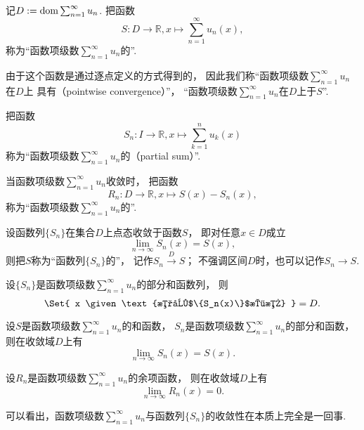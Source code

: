 \begin{definition}
记\(D := \operatorname{dom}\sum_{n=1}^\infty u_n\).
把函数\[
	S\colon D\to\mathbb{R},
	x \mapsto \sum_{n=1}^\infty u_n(x),
\]称为“函数项级数\(\sum_{n=1}^\infty u_n\)的”.

由于这个函数是通过逐点定义的方式得到的，
因此我们称“函数项级数\(\sum_{n=1}^\infty u_n\)在\(D\)上
具有（pointwise convergence）”，
“函数项级数\(\sum_{n=1}^\infty u_n\)在\(D\)上于\(S\)”.

把函数\[
	S_n\colon I\to\mathbb{R},
	x \mapsto \sum_{k=1}^n u_k(x)
\]称为“函数项级数\(\sum_{n=1}^\infty u_n\)的（partial sum）”.
\end{definition}

\begin{definition}
当函数项级数\(\sum_{n=1}^\infty u_n\)收敛时，
把函数\[
	R_n\colon D\to\mathbb{R},
	x \mapsto S(x) - S_n(x),
\]称为“函数项级数\(\sum_{n=1}^\infty u_n\)的”.
\end{definition}

\begin{definition}
设函数列\(\{S_n\}\)在集合\(D\)上点态收敛于函数\(S\)，
即对任意\(x \in D\)成立\[
	\lim_{n\to\infty} S_n(x) = S(x),
\]
则把\(S\)称为“函数列\(\{S_n\}\)的”，
记作\(S_n \overset{D}\to S\)；
不强调区间\(D\)时，也可以记作\(S_n \to S\).
\end{definition}

\begin{proposition}
设\(\{S_n\}\)是函数项级数\(\sum_{n=1}^\infty u_n\)的部分和函数列，
则\[
	\Set{ x \given \text{数列$\{S_n(x)\}$收敛} } = D.
\]
\end{proposition}
\begin{proposition}
设\(S\)是函数项级数\(\sum_{n=1}^\infty u_n\)的和函数，
\(S_n\)是函数项级数\(\sum_{n=1}^\infty u_n\)的部分和函数，
则在收敛域\(D\)上有\[
	\lim_{n\to\infty} S_n(x) = S(x).
\]
\end{proposition}
\begin{proposition}
设\(R_n\)是函数项级数\(\sum_{n=1}^\infty u_n\)的余项函数，
则在收敛域\(D\)上有\[
	\lim_{n\to\infty} R_n(x) = 0.
\]
\end{proposition}
\begin{remark}
可以看出，函数项级数\(\sum_{n=1}^\infty u_n\)与函数列\(\{S_n\}\)的收敛性在本质上完全是一回事.
\end{remark}

